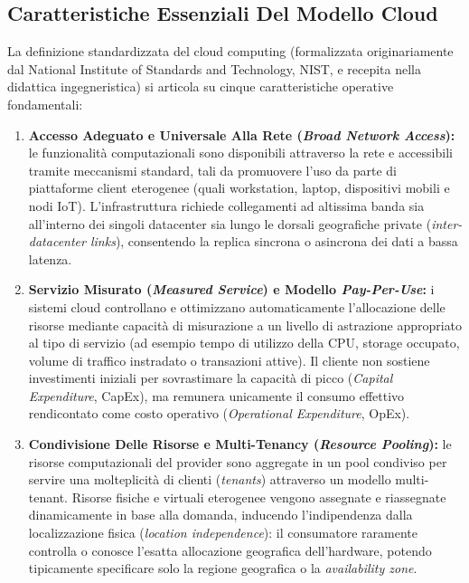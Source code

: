 \documentclass[11pt, a4paper]{article}
\begin{document}

\subsection{Caratteristiche Essenziali Del Modello Cloud}

La definizione standardizzata del cloud computing (formalizzata originariamente dal National Institute of Standards and Technology, NIST, e recepita nella didattica ingegneristica) si articola su cinque caratteristiche operative fondamentali:

\begin{enumerate}
    \item \textbf{Accesso Adeguato e Universale Alla Rete (\emph{Broad Network Access}):} le funzionalità computazionali sono disponibili attraverso la rete e accessibili tramite meccanismi standard, tali da promuovere l'uso da parte di piattaforme client eterogenee (quali workstation, laptop, dispositivi mobili e nodi IoT). L'infrastruttura richiede collegamenti ad altissima banda sia all'interno dei singoli datacenter sia lungo le dorsali geografiche private (\emph{inter-datacenter links}), consentendo la replica sincrona o asincrona dei dati a bassa latenza.

    \item \textbf{Servizio Misurato (\emph{Measured Service}) e Modello \emph{Pay-Per-Use}:} i sistemi cloud controllano e ottimizzano automaticamente l'allocazione delle risorse mediante capacità di misurazione a un livello di astrazione appropriato al tipo di servizio (ad esempio tempo di utilizzo della CPU, storage occupato, volume di traffico instradato o transazioni attive). Il cliente non sostiene investimenti iniziali per sovrastimare la capacità di picco (\emph{Capital Expenditure}, CapEx), ma remunera unicamente il consumo effettivo rendicontato come costo operativo (\emph{Operational Expenditure}, OpEx).

    \item \textbf{Condivisione Delle Risorse e Multi-Tenancy (\emph{Resource Pooling}):} le risorse computazionali del provider sono aggregate in un pool condiviso per servire una molteplicità di clienti (\emph{tenants}) attraverso un modello multi-tenant. Risorse fisiche e virtuali eterogenee vengono assegnate e riassegnate dinamicamente in base alla domanda, inducendo l'indipendenza dalla localizzazione fisica (\emph{location independence}): il consumatore raramente controlla o conosce l'esatta allocazione geografica dell'hardware, potendo tipicamente specificare solo la regione geografica o la \emph{availability zone}.


\end{enumerate}
\end{document}
